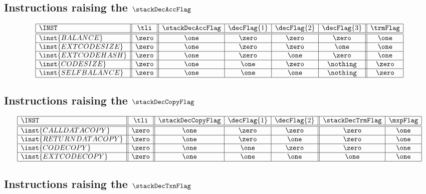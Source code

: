 \subsection{Instructions raising the $\stackDecAccFlag$}
\label{hub: instruction handling: Acc}

\[
\begin{array}{|l||c||c|c|c|c||c|}
	\hline
	\INST 				& \tli	& \stackDecAccFlag	& \decFlag{1} 	& \decFlag{2} 	& \decFlag{3}	& \trmFlag	\\ \hline\hline
	\inst{BALANCE}		& \zero & \one			& \zero			& \zero			& \zero			& \one		\\ \hline
	\inst{EXTCODESIZE}	& \zero & \one			& \zero			& \zero			& \one			& \one		\\ \hline
	\inst{EXTCODEHASH}	& \zero & \one			& \zero			& \one			& \zero			& \one		\\ \hline
	\inst{CODESIZE}		& \zero & \one			& \one			& \zero			& \nothing 		& \zero		\\ \hline
	\inst{SELFBALANCE}	& \zero & \one			& \one			& \one			& \nothing 		& \zero		\\ \hline
\end{array}
\]

\subsection{Instructions raising the $\stackDecCopyFlag$}
\label{hub: instruction handling: Copy}

\[
\begin{array}{|l||c||c|c|c||c|c|}
	\hline
	\INST 					& \tli	& \stackDecCopyFlag	& \decFlag{1} 	& \decFlag{2}	& \stackDecTrmFlag	& \mxpFlag	\\ \hline\hline
	\inst{CALLDATACOPY}		& \zero & \one			& \zero			& \zero			& \zero			& \one		\\ \hline
	\inst{RETURNDATACOPY}	& \zero & \one			& \zero			& \one			& \zero			& \one		\\ \hline
	\inst{CODECOPY}			& \zero & \one			& \one			& \zero			& \zero			& \one		\\ \hline
	\inst{EXTCODECOPY}		& \zero & \one			& \one			& \one			& \one			& \one		\\ \hline
\end{array}
\]

\subsection{Instructions raising the $\stackDecTxnFlag$}
\label{hub: instruction handling: Txn}

